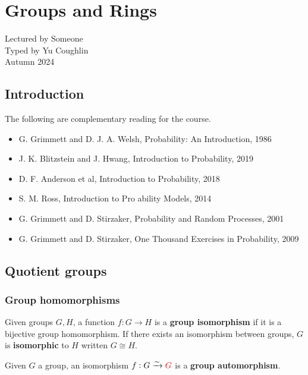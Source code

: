 \documentclass[../Year2.tex]{subfiles}
\begin{document}
\chapter{Groups and Rings}
\renewcommand*\thesection{\arabic{section}}
Lectured by Someone \\ Typed by Yu Coughlin \\
Autumn 2024

\section*{Introduction}

The following are complementary reading for the course.
\begin{itemize}
    \item G. Grimmett and D. J. A. Welsh, Probability: An Introduction, 1986
    \item J. K. Blitzstein and J. Hwang, Introduction to Probability, 2019
    \item D. F. Anderson et al, Introduction to Probability, 2018
    \item S. M. Ross, Introduction to Pro ability Models, 2014
    \item G. Grimmett and D. Stirzaker, Probability and Random Processes, 2001
    \item G. Grimmett and D. Stirzaker, One Thousand Exercises in Probability, 2009
\end{itemize}

\tableofcontents\pagebreak

\section{Quotient groups}

\subsection{Group homomorphisms}

\begin{definition}
    Given groups $G,H$, a function $f:G\rightarrow H$ is a \textbf{group isomorphism} if it is a bijective group homomorphism. If there exists an isomorphism between groups, $G$ is \textbf{isomorphic} to $H$ written $G\cong H$.
\end{definition}

\begin{definition}
    Given $G$ a group, an isomorphism $f:G\xrightarrow{\sim}\textcolor{red}{G}$ is a \textbf{group automorphism}.
\end{definition}
\end{document}
